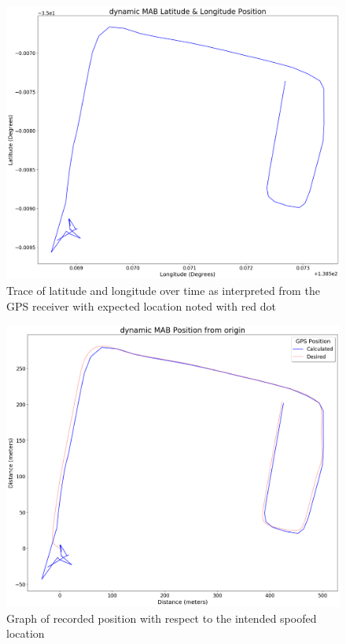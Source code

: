 \begin{figure}[h]
    \begin{centering}
        \includegraphics[width=14cm,keepaspectratio]{Figures/2021_3_30_dynamic_MAB Lat long position.png}
        \caption{Trace of latitude and longitude over time as interpreted from the GPS receiver with expected location noted with red dot}
        \label{fig:MABdynamicCoord}
    \end{centering}
\end{figure}

\begin{figure}[h]
    \begin{centering}
        \includegraphics[width=14cm,keepaspectratio]{Figures/2021_3_30_dynamic_MAB Position from origin.png}
        \caption{Graph of recorded position with respect to the intended spoofed location}
        \label{fig:MABdynamicPosition}
    \end{centering}
\end{figure}

